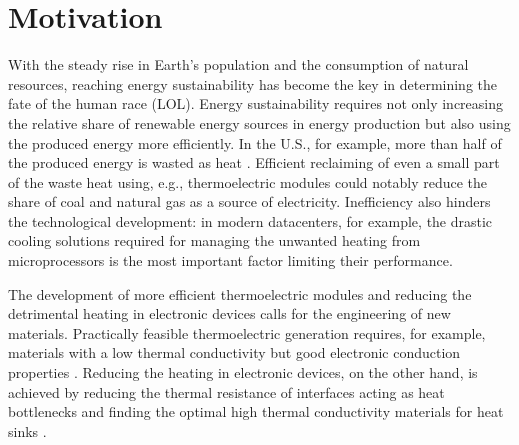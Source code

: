 
\section{Motivation}


With the steady rise in Earth's population and the consumption of natural resources, reaching energy sustainability has become the key in determining the fate of the human race (LOL). Energy sustainability requires not only increasing the relative share of renewable energy sources in energy production but also using the produced energy more efficiently. In the U.S., for example, more than half of the produced energy is wasted as heat \cite{llnl13}. Efficient reclaiming of even a small part of the waste heat using, e.g., thermoelectric modules could notably reduce the share of coal and natural gas as a source of electricity. Inefficiency also hinders the technological development: in modern datacenters, for example, the drastic cooling solutions required for managing the unwanted heating from microprocessors is the most important factor limiting their performance. %





The development of more efficient thermoelectric modules and reducing the detrimental heating in electronic devices calls for the engineering of new materials. Practically feasible thermoelectric generation requires, for example, materials with a low thermal conductivity but good electronic conduction properties \cite{chen}. Reducing the heating in electronic devices, on the other hand, is achieved by reducing the thermal resistance of interfaces acting as heat bottlenecks and finding the optimal high thermal conductivity materials for heat sinks \cite{pop10}. 

